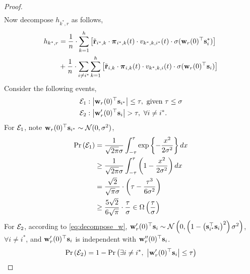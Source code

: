\documentclass[10pt]{article}
\begin{document}
\begin{proof}
\begin{equation*}
\begin{split}
\end{split}
\end{equation*}
Now decompose $h_{k^*,r}$ as follows,
\begin{equation}
\label{eq:decompose_h}
\begin{split}
	h_{k^*,r} &= \frac{1}{n} \cdot \sum\limits_{k=1}^{h}{ \left[ {\tilde{\mathbf{r}}}_{i^*,k} \cdot {\boldsymbol{\pi}}_{i^*,k}(t) \cdot v_{k^*,k,i^*}(t) \cdot \sigma( {\mathbf{w}}_r(0)^\top {\mathbf{s}}_i^* ) \right] } \\
	&+ \frac{1}{n} \cdot \sum\limits_{i \not= i^*}{\sum\limits_{k=1}^{h}{ \left[ {\tilde{\mathbf{r}}}_{i,k} \cdot {\boldsymbol{\pi}}_{i,k}(t) \cdot v_{k^*,k,i}(t) \cdot \sigma( {\mathbf{w}}_r(0)^\top {\mathbf{s}}_i ) \right] } }
\end{split}
\end{equation}
Consider the following events,
\begin{equation*}
\begin{split}
	\gE_1 &: \left| \rvw_r(0)^\top \rvs_{i^*} \right| \le \tau, \ \text{given } \tau \le \sigma \\
	\gE_2 &: \left| \rvw_r^\prime(0)^\top \rvs_i \right| > \tau, \ \forall i \not= i^*.
\end{split}
\end{equation*}
For ${\mathcal{E}}_1$, note ${\mathbf{w}}_r(0)^\top {\mathbf{s}}_{i^*} \sim {\mathcal{N}}(0, \sigma^2)$,
\begin{equation*}
\begin{split}
	{\text{Pr}}\left({\mathcal{E}}_1\right) &= \frac{1}{\sqrt{2\pi}\sigma} \int_{-\tau}^{\tau}{\exp\left\{ - \frac{x^2}{2\sigma^2} \right\} dx} \\
	&\ge \frac{1}{\sqrt{2\pi}\sigma} \int_{-\tau}^{\tau}{ \left( 1  - \frac{x^2}{2\sigma^2} \right) dx} \\
	&= \frac{\sqrt{2}}{\sqrt{\pi}\sigma} \cdot \left( \tau - \frac{\tau^3}{6\sigma^2}\right) \\
	&\ge \frac{5\sqrt{2}}{6\sqrt{\pi}} \cdot \frac{\tau}{\sigma} \in \Omega\left( \frac{\tau}{\sigma} \right)
\end{split}
\end{equation*}
For ${\mathcal{E}}_2$, according to \cref{eq:decompose_w}, ${\mathbf{w}}_r^\prime(0)^\top {\mathbf{s}}_i \sim {\mathcal{N}}\left(0, \left(1 - \left({\mathbf{s}}_{i^*}^\top {\mathbf{s}}_{i} \right)^2 \right)\sigma^2 \right)$, $\forall i \not= i^*$, and ${\mathbf{w}}_r^\prime(0)^\top {\mathbf{s}}_i$ is independent with ${\mathbf{w}}_r^{\prime\prime}(0)^\top {\mathbf{s}}_{i}$.
\begin{equation*}
\begin{split}
	\pr\left(\gE_2\right) &= 1 - \pr\left( \exists i \not= i^*, \ \left| \rvw_r^\prime(0)^\top \rvs_i \right| \le \tau \right) \\

\end{split}
\end{equation*}
\end{proof}
\end{document}
